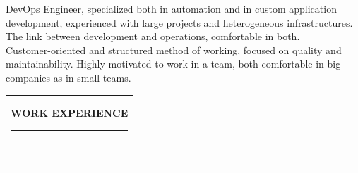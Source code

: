 \documentclass[10pt,A4]{article}
\newcommand{\mpwidth}{\linewidth-\fboxsep-\fboxsep}
\newcommand{\cvtext}[1] {
	\begin{tabular*}{1\mpwidth}{p{0.98\mpwidth}}
		\parbox{1\mpwidth}{#1}
	\end{tabular*}
}
\newcommand\cvsection[1]{
	\vspace{14pt}
	\cvtext{
        \textbf{\LARGE{\textcolor{darkcol}{\uppercase{#1}}}}\\[-4pt]
        \textcolor{maincol}{ \rule{0.1\textwidth}{2pt} } \\
	}
}
\begin{document}
\begin{paracol}{2}
\begin{rightcolumn}
{    DevOps Engineer, specialized both in automation and in custom application development, experienced with large projects and heterogeneous infrastructures. The link between development and operations, comfortable in both.\\
    
    Customer-oriented and structured method of working, focused on quality and maintainability. Highly motivated to work in a team, both comfortable in big companies as in small teams.\\
    
    }

\vfill\null
\cvsection{WORK EXPERIENCE}


\end{rightcolumn}
\end{paracol}
\end{document}
